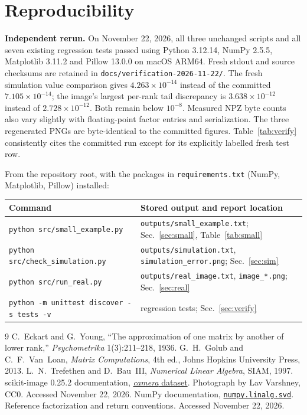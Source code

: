 \documentclass[11pt,letterpaper]{article}
\numberwithin{equation}{section}
\newcommand{\fn}[1]{\texttt{#1}}
\begin{document}
\section{Reproducibility}\label{sec:repro}
\textbf{Independent rerun.} On November 22, 2026, all three unchanged scripts and all seven existing regression tests passed using Python 3.12.14, NumPy 2.5.5, Matplotlib 3.11.2 and Pillow 13.0.0 on macOS ARM64. Fresh stdout and source checksums are retained in \fn{docs/verification-2026-11-22/}. The fresh simulation value comparison gives $4.263\times10^{-14}$ instead of the committed $7.105\times10^{-14}$; the image's largest per-rank tail discrepancy is $3.638\times10^{-12}$ instead of $2.728\times10^{-12}$. Both remain below $10^{-8}$. Measured NPZ byte counts also vary slightly with floating-point factor entries and serialization. The three regenerated PNGs are byte-identical to the committed figures. Table~\ref{tab:verify} consistently cites the committed run except for its explicitly labelled fresh test row.


From the repository root, with the packages in \fn{requirements.txt} (NumPy, Matplotlib, Pillow) installed:
\begin{center}\small
\begin{tabular}{@{}l l@{}}\toprule
Command & Stored output and report location\\\midrule
\fn{python src/small\_example.py} & \fn{outputs/small\_example.txt}; Sec.~\ref{sec:small}, Table~\ref{tab:small}\\
\fn{python src/check\_simulation.py} & \fn{outputs/simulation.txt}, \fn{simulation\_error.png}; Sec.~\ref{sec:sim}\\
\fn{python src/run\_real.py} & \fn{outputs/real\_image.txt}, \fn{image\_*.png}; Sec.~\ref{sec:real}\\
\fn{python -m unittest discover -s tests -v} & regression tests; Sec.~\ref{sec:verify}\\\bottomrule
\end{tabular}
\end{center}
\clearpage
\begin{thebibliography}{9}\small
{} C.~Eckart and G.~Young, ``The approximation of one matrix by another of lower rank,'' \emph{Psychometrika} 1(3):211--218, 1936.
 G.~H.~Golub and C.~F.~Van~Loan, \emph{Matrix Computations}, 4th ed., Johns Hopkins University Press, 2013.
 L.~N.~Trefethen and D.~Bau~III, \emph{Numerical Linear Algebra}, SIAM, 1997.
 scikit-image 0.25.2 documentation, \href{https://scikit-image.org/docs/0.25.x/api/skimage.data.html\#skimage.data.camera}{\emph{camera} dataset}. Photograph by Lav Varshney, CC0. Accessed November 22, 2026.
 NumPy documentation, \href{https://numpy.org/doc/stable/reference/generated/numpy.linalg.svd.html}{\fn{numpy.linalg.svd}}. Reference factorization and return conventions. Accessed November 22, 2026.
\end{thebibliography}
\end{document}
